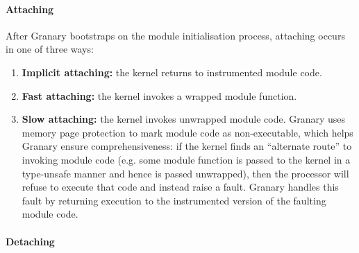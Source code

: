 \documentclass[preprint]{sigplanconf}
\newcommand{\comment}[1]{}
\begin{document}



\paragraph{Attaching}\label{sec:attach}
After Granary bootstraps on the module initialisation process, attaching occurs in one of three ways: \begin{enumerate}
	\item {\bf Implicit attaching:} the kernel returns to instrumented module code.
	\item {\bf Fast attaching:} the kernel invokes a wrapped module function.
	\item {\bf Slow attaching:} the kernel invokes unwrapped module code. Granary uses memory page protection to mark module code as non-executable, which helps Granary ensure comprehensiveness: if the kernel finds an ``alternate route'' to invoking module code (e.g. some module function is passed to the kernel in a type-unsafe manner and hence is passed unwrapped), then the processor will refuse to execute that code and instead raise a fault. Granary handles this fault by returning execution to the instrumented version of the faulting module code.
\end{enumerate}


\paragraph{Detaching}
\end{document}
